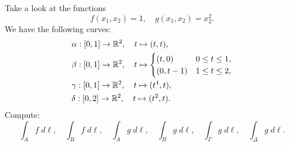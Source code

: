 \documentclass[11pt]{article}
\begin{document}
\begin{exercise}
    Take a look at the functions 
    \[
        f(x_1,x_2) = 1, \quad g(x_1,x_2) = x_2^2.
    \]
    We have the following curves:
    \begin{align*}
        &\alpha : [0,1] \to \mathbb{R}^2, \quad t \mapsto (t,t),
        \\
        &\beta  : [0,1] \to \mathbb{R}^2, \quad t \mapsto \begin{cases} (t,0) & 0 \leq t \leq 1, \\ (0,t-1) & 1 \leq t \leq 2, \end{cases}
        \\
        &\gamma : [0,1] \to \mathbb{R}^2, \quad t \mapsto (t^4,t),
        \\
        &\delta : [0,2] \to \mathbb{R}^2, \quad t \mapsto (t^2,t).
    \end{align*}
    Compute:
    \[
        \int_A f \;d\ell, \quad \int_B f \;d\ell, \quad 
        \int_A g \;d\ell, \quad \int_B g \;d\ell, \quad 
        \int_\Gamma g \;d\ell, \quad \int_\Delta g \;d\ell
        .
    \]
\end{exercise}
\end{document}
